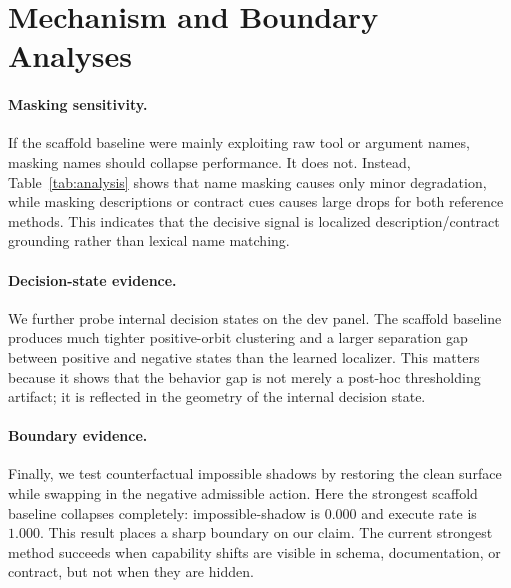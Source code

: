 \section{Mechanism and Boundary Analyses}
\label{sec:analysis}

\paragraph{Masking sensitivity.}
If the scaffold baseline were mainly exploiting raw tool or argument names, masking names should collapse performance. It does not. Instead, Table~\ref{tab:analysis} shows that name masking causes only minor degradation, while masking descriptions or contract cues causes large drops for both reference methods. This indicates that the decisive signal is localized description/contract grounding rather than lexical name matching.

\paragraph{Decision-state evidence.}
We further probe internal decision states on the dev panel. The scaffold baseline produces much tighter positive-orbit clustering and a larger separation gap between positive and negative states than the learned localizer. This matters because it shows that the behavior gap is not merely a post-hoc thresholding artifact; it is reflected in the geometry of the internal decision state.

\paragraph{Boundary evidence.}
Finally, we test counterfactual impossible shadows by restoring the clean surface while swapping in the negative admissible action. Here the strongest scaffold baseline collapses completely: impossible-shadow \CAA{} is $0.000$ and execute rate is $1.000$. This result places a sharp boundary on our claim. The current strongest method succeeds when capability shifts are visible in schema, documentation, or contract, but not when they are hidden.

